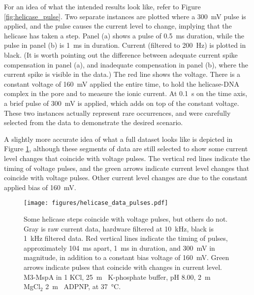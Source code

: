 For an idea of what the intended results look like, refer to Figure \ref{fig:helicase_pulse}.  Two separate instances are plotted where a \SI{300}{\mV} pulse is applied, and the pulse causes the current level to change, implying that the helicase has taken a step.  Panel (a) shows a pulse of \SI{0.5}{\ms} duration, while the pulse in panel (b) is \SI{1}{\ms} in duration.  Current (filtered to \SI{200}{\Hz}) is plotted in black.  (It is worth pointing out the difference between adequate current spike compensation in panel (a), and inadequate compensation in panel (b), where the current spike is visible in the data.)  The red line shows the voltage.  There is a constant voltage of \SI{160}{\mV} applied the entire time, to hold the helicase-DNA complex in the pore and to measure the ionic current.  At \SI{0.1}{\s} on the time axis, a brief pulse of \SI{300}{\mV} is applied, which adds on top of the constant voltage.  These two instances actually represent rare occurrences, and were carefully selected from the data to demonstrate the desired scenario.

A slightly more accurate idea of what a full dataset looks like is depicted in Figure \ref{fig:helicase_pulse_traces}, although these segments of data are still selected to show some current level changes that coincide with voltage pulses.  The vertical red lines indicate the timing of voltage pulses, and the green arrows indicate current level changes that coincide with voltage pulses.  Other current level changes are due to the constant applied bias of \SI{160}{\mV}.

\begin{figure}[h]
\begin{centering}
\texttt{[image: figures/helicase\_data\_pulses.pdf]}
\caption[A fraction of pulses move the helicase]{Some helicase steps coincide with voltage pulses, but others do not.  Gray is raw current data, hardware filtered at \SI{10}{\kHz}, black is \SI{1}{\kHz} filtered data.  Red vertical lines indicate the timing of pulses, approximately \SI{104}{\ms} apart, \SI{1}{\ms} in duration, and \SI{300}{\mV} in magnitude, in addition to a constant bias voltage of \SI{160}{\mV}.  Green arrows indicate pulses that coincide with changes in current level. M3-MspA in \SI{1}{\Molar} KCl, \SI{25}{\m\Molar} K-phosphate buffer, pH \num{8.00}, \SI{2}{\m\Molar} MgCl$_2$ \SI{2}{\m\Molar} ADPNP, at \SI{37}{\celsius}.}
\label{fig:helicase_pulse_traces}
\end{centering}
\end{figure}

